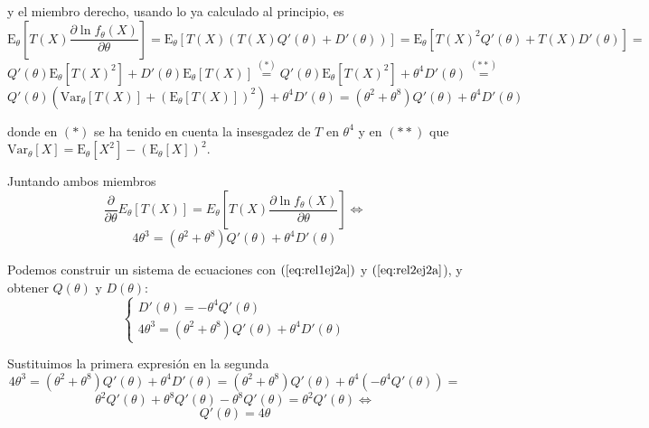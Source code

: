 \documentclass[12pt]{article}
\newcommand{\E}{\mathrm{E}}
\newcommand{\V}{\mathrm{Var}}
\begin{document}
\begin{ejercicio}
\begin{enumerate}[label=\alph*)]
                y el miembro derecho, usando lo ya calculado al principio, es
                $$\E_\theta \left[T(X) \dfrac{\partial \ln f_\theta (X)}
                {\partial \theta} \right] = 
                \E_\theta \left[T(X) \left( T(X) Q'(\theta) + D'(\theta) \right) \right] = 
                \E_\theta \left[T(X)^2 Q'(\theta) + T(X)D'(\theta) \right] = $$
                $$Q'(\theta) \E_\theta[T(X)^2] + D'(\theta) \E_\theta[T(X)] \stackrel{(*)}{=}
                Q'(\theta) \E_\theta[T(X)^2] + \theta^4 D'(\theta) \stackrel{(**)}{=} $$
                $$Q'(\theta) (\V_\theta[T(X)] + (\E_\theta[T(X)])^2) + \theta^4 D'(\theta) = 
                (\theta^2 + \theta^8) Q'(\theta) + \theta^4 D'(\theta)$$

                donde en $(*)$ se ha tenido en cuenta la insesgadez de $T$ en $\theta^4$ y 
                en $(**)$ que $\V_\theta[X] = \E_\theta[X^2] - (\E_\theta[X])^2$. 
                
                \newpage
                
                Juntando ambos miembros
                $$\dfrac{\partial}{\partial \theta} E_\theta[T(X)] = E_\theta \left[T(X) \dfrac{\partial \ln f_\theta (X)}
                {\partial \theta} \right] \iff$$
                \begin{equation}\label{eq:rel2ej2a}
                    4 \theta^3 = (\theta^2 + \theta^8) Q'(\theta) + \theta^4 D'(\theta)
                \end{equation}

                Podemos construir un sistema de ecuaciones con $(\ref{eq:rel1ej2a})$ y $(\ref{eq:rel2ej2a}$), y obtener $Q(\theta)$ y $D(\theta)$:
                $$\begin{cases}
                    D'(\theta) = - \theta^4 Q'(\theta) \\
                    4 \theta^3 = (\theta^2 + \theta^8) Q'(\theta) + \theta^4 D'(\theta)
                \end{cases}$$

                Sustituimos la primera expresión en la segunda
                $$4 \theta^3 = (\theta^2 + \theta^8) Q'(\theta) + \theta^4 D'(\theta) = (\theta^2 + \theta^8) Q'(\theta) + \theta^4 (-\theta^4 Q'(\theta)) = $$
                $$\theta^2 Q'(\theta) + \theta^8 Q'(\theta) - \theta^8 Q'(\theta) = \theta^2 Q'(\theta) \iff$$
                $$Q'(\theta) = 4 \theta$$


\end{enumerate}
\end{ejercicio}
\end{document}
